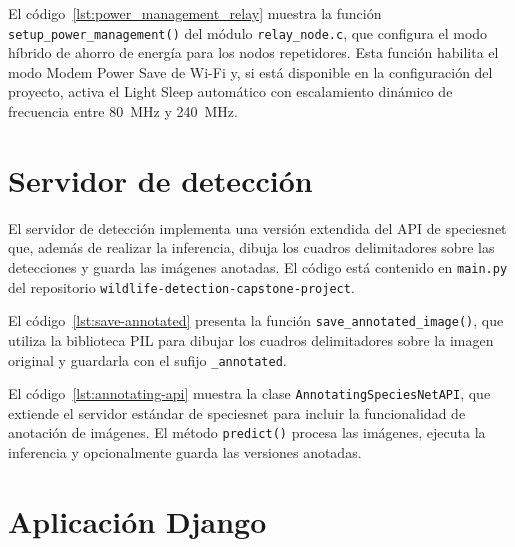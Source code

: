 \documentclass[a4paper, 12pt]{report}
\begin{document}
El código~\ref{lst:power_management_relay} muestra la función
\texttt{setup\_power\_management()} del módulo \texttt{relay\_node.c}, que configura
el modo híbrido de ahorro de energía para los nodos repetidores. Esta función habilita
el modo Modem Power Save de Wi-Fi y, si está disponible en la configuración del proyecto,
activa el Light Sleep automático con escalamiento dinámico de frecuencia entre
\qty{80}{\mega\hertz} y \qty{240}{\mega\hertz}.



\section{Servidor de detección}

El servidor de detección implementa una versión extendida del API de \gls{speciesnet}
que, además de realizar la \gls{inferencia}, dibuja los cuadros delimitadores
sobre las detecciones y guarda las imágenes anotadas. El código está contenido
en \texttt{main.py} del repositorio \texttt{wildlife-detection-capstone-project}.

El código~\ref{lst:save-annotated} presenta la función \texttt{save\_annotated\_image()},
que utiliza la biblioteca PIL para dibujar los cuadros delimitadores sobre la
imagen original y guardarla con el sufijo \texttt{\_annotated}.



El código~\ref{lst:annotating-api} muestra la clase \texttt{AnnotatingSpeciesNetAPI},
que extiende el servidor estándar de \gls{speciesnet} para incluir la funcionalidad
de anotación de imágenes. El método \texttt{predict()} procesa las imágenes,
ejecuta la \gls{inferencia} y opcionalmente guarda las versiones anotadas.



\section{Aplicación Django}
\end{document}
